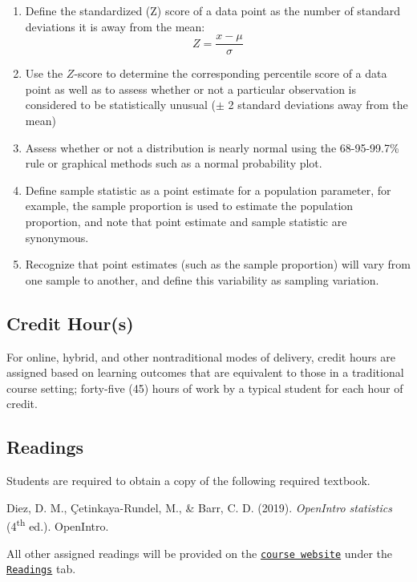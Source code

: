 \documentclass[
]{article}
\providecommand{\tightlist}{%
  \setlength{\itemsep}{0pt}\setlength{\parskip}{0pt}}
\begin{document}
\begin{enumerate}
\def\labelenumi{\arabic{enumi}.}
\tightlist
\item
  Define the standardized (Z) score of a data point as the number of
  standard deviations it is away from the mean:
  \[Z = \frac{x-\mu}{\sigma}\]
\item
  Use the \(Z\)-score to determine the corresponding percentile score of
  a data point as well as to assess whether or not a particular
  observation is considered to be statistically unusual (\(\pm\) 2
  standard deviations away from the mean)
\item
  Assess whether or not a distribution is nearly normal using the
  68-95-99.7\% rule or graphical methods such as a normal probability
  plot.
\item
  Define sample statistic as a point estimate for a population
  parameter, for example, the sample proportion is used to estimate the
  population proportion, and note that point estimate and sample
  statistic are synonymous.
\item
  Recognize that point estimates (such as the sample proportion) will
  vary from one sample to another, and define this variability as
  sampling variation.
\end{enumerate}

\subsection{Credit Hour(s)}

For online, hybrid, and other nontraditional modes of delivery, credit
hours are assigned based on learning outcomes that are equivalent to
those in a traditional course setting; forty-five (45) hours of work by
a typical student for each hour of credit.

\subsection{Readings}

Students are required to obtain a copy of the following required
textbook.

\begin{hangparas}{.4in}{1}
Diez, D. M.,  \c{C}etinkaya-Rundel, M., \& Barr, C. D. (2019).  {\em{OpenIntro statistics}} (4\textsuperscript{th} ed.).  OpenIntro.
\end{hangparas}

All other assigned readings will be provided on the
\texttt{\href{https://mycourses.umhb.edu/courses/23599}{course website}}
under the
\texttt{\href{https://mycourses.umhb.edu/courses/23599/files/folder/Readings}{Readings}}
tab.
\end{document}
